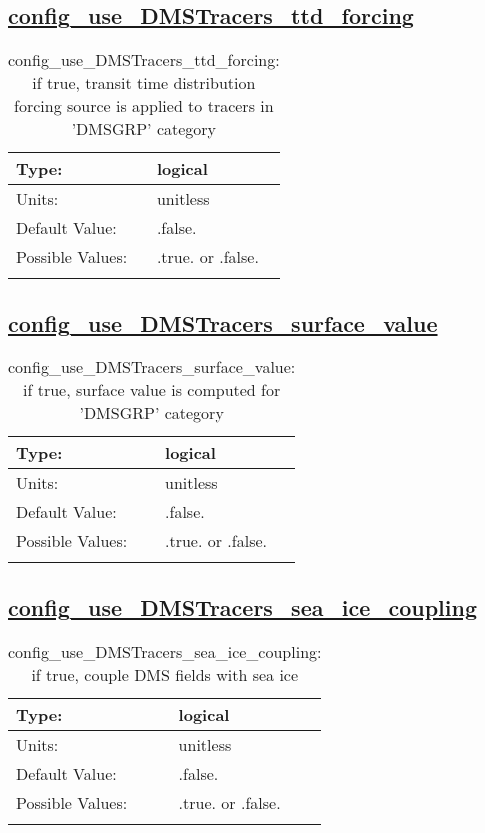 \subsection[config\_use\_DMSTracers\_ttd\_forcing]{\hyperref[sec:nm_tab_tracer_forcing_DMSTracers]{config\_use\_DMSTracers\_ttd\_forcing}}
\label{subsec:nm_sec_config_use_DMSTracers_ttd_forcing}
\begin{center}
\begin{longtable}{| p{2.0in} || p{4.0in} |}
    \hline
    Type: & logical \\
    \hline
    Units: & \si{unitless} \\
    \hline
    Default Value: & .false. \\
    \hline
    Possible Values: & .true. or .false. \\
    \hline
    \caption{config\_use\_DMSTracers\_ttd\_forcing: if true, transit time distribution forcing source is applied to tracers in 'DMSGRP' category}
\end{longtable}
\end{center}
\subsection[config\_use\_DMSTracers\_surface\_value]{\hyperref[sec:nm_tab_tracer_forcing_DMSTracers]{config\_use\_DMSTracers\_surface\_value}}
\label{subsec:nm_sec_config_use_DMSTracers_surface_value}
\begin{center}
\begin{longtable}{| p{2.0in} || p{4.0in} |}
    \hline
    Type: & logical \\
    \hline
    Units: & \si{unitless} \\
    \hline
    Default Value: & .false. \\
    \hline
    Possible Values: & .true. or .false. \\
    \hline
    \caption{config\_use\_DMSTracers\_surface\_value: if true, surface value is computed for 'DMSGRP' category}
\end{longtable}
\end{center}
\subsection[config\_use\_DMSTracers\_sea\_ice\_coupling]{\hyperref[sec:nm_tab_tracer_forcing_DMSTracers]{config\_use\_DMSTracers\_sea\_ice\_coupling}}
\label{subsec:nm_sec_config_use_DMSTracers_sea_ice_coupling}
\begin{center}
\begin{longtable}{| p{2.0in} || p{4.0in} |}
    \hline
    Type: & logical \\
    \hline
    Units: & \si{unitless} \\
    \hline
    Default Value: & .false. \\
    \hline
    Possible Values: & .true. or .false. \\
    \hline
    \caption{config\_use\_DMSTracers\_sea\_ice\_coupling: if true, couple DMS fields with sea ice}
\end{longtable}
\end{center}
